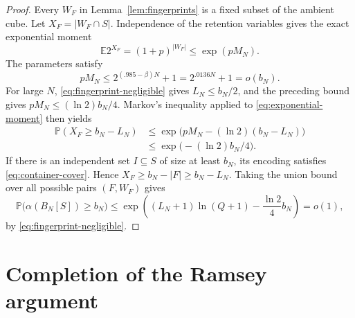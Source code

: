 \documentclass[11pt,leqno]{amsart}
\numberwithin{equation}{section}
\theoremstyle{definition}
\theoremstyle{remark}
\newcommand{\E}{\mathbb E}
\newcommand{\Prob}{\mathbb P}
\newcommand{\abs}[1]{\lvert#1\rvert}
\begin{document}
\begin{proof}
Every $W_F$ in Lemma~\ref{lem:fingerprints} is a fixed subset of the ambient cube. Let $X_F=\abs{W_F\cap S}$. Independence of the retention variables gives the exact exponential moment
\begin{equation}\label{eq:exponential-moment}
 \E 2^{X_F}=(1+p)^{\abs{W_F}}\le\exp(pM_N).
\end{equation}
The parameters satisfy
\[
 pM_N\le2^{(.985-\beta)N}+1
 =2^{.0136N}+1=o(b_N).
\]
For large $N$, \eqref{eq:fingerprint-negligible} gives $L_N\le b_N/2$, and the preceding bound gives $pM_N\le(\ln2)b_N/4$. Markov's inequality applied to \eqref{eq:exponential-moment} then yields
\begin{align*}
 \Prob(X_F\ge b_N-L_N)
 &\le \exp\bigl(pM_N-(\ln2)(b_N-L_N)\bigr)\\
 &\le\exp\bigl(- (\ln2)b_N/4\bigr).
\end{align*}
If there is an independent set $I\subseteq S$ of size at least $b_N$, its encoding satisfies \eqref{eq:container-cover}. Hence $X_F\ge b_N-\abs F\ge b_N-L_N$. Taking the union bound over all possible pairs $(F,W_F)$ gives
\[
 \Prob\bigl(\alpha(B_N[S])\ge b_N\bigr)
 \le\exp\left((L_N+1)\ln(Q+1)-\frac{\ln2}{4}b_N\right)=o(1),
\]
by \eqref{eq:fingerprint-negligible}.
\end{proof}

\section{Completion of the Ramsey argument}
\end{document}
